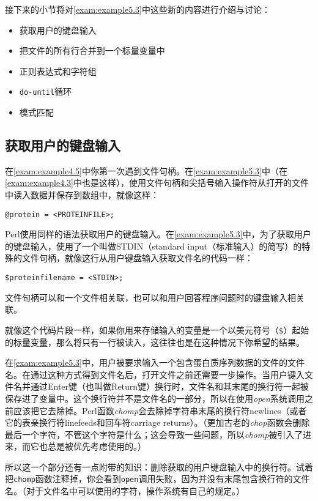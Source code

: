 接下来的小节将对\autoref{exam:example5.3}中这些新的内容进行介绍与讨论：

\begin{itemize}
  \item 获取用户的键盘输入
  \item 把文件的所有行合并到一个标量变量中
  \item 正则表达式和字符组
  \item \verb|do-until|循环
  \item 模式匹配
\end{itemize}

\subsection{获取用户的键盘输入}
在\autoref{exam:example4.5}中你第一次遇到文件句柄。在\autoref{exam:example5.3}中（在\autoref{exam:example4.3}中也是这样），使用文件句柄和尖括号输入操作符从打开的文件中读入数据并保存到数组中，就像这样：

\begin{lstlisting}
@protein = <PROTEINFILE>;
\end{lstlisting}

Perl使用同样的语法获取用户的键盘输入。在\autoref{exam:example5.3}中，为了获取用户的键盘输入，使用了一个叫做STDIN（standard input（标准输入）的简写）的特殊的文件句柄，就像这行从用户键盘输入获取文件名的代码一样：

\begin{lstlisting}
$proteinfilename = <STDIN>;
\end{lstlisting}

文件句柄可以和一个文件相关联，也可以和用户回答程序问题时的键盘输入相关联。

就像这个代码片段一样，如果你用来存储输入的变量是一个以美元符号（\verb|$|）起始的标量变量，那么将只有一行被读入，这往往也是在这种情况下你希望的结果。

在\autoref{exam:example5.3}中，用户被要求输入一个包含蛋白质序列数据的文件的文件名。在通过这种方式得到文件名后，打开文件之前还需要一步操作。当用户键入文件名并通过Enter键（也叫做Return键）换行时，文件名和其末尾的换行符一起被保存进了变量中。这个换行符并不是文件名的一部分，所以在使用\textit{open}系统调用之前应该把它去除掉。Perl函数\textit{chomp}会去除掉字符串末尾的换行符newlines（或者它的表亲换行符linefeeds和回车符carriage returns）。（更加古老的\textit{chop}函数会删除最后一个字符，不管这个字符是什么；这会导致一些问题，所以\textit{chomp}被引入了进来，而它也总是被优先考虑使用的。）

所以这一个部分还有一点附带的知识：删除获取的用户键盘输入中的换行符。试着把\verb|chomp|函数注释掉，你会看到\verb|open|调用失败，因为并没有末尾包含换行符的文件名。（对于文件名中可以使用的字符，操作系统有自己的规定。）

